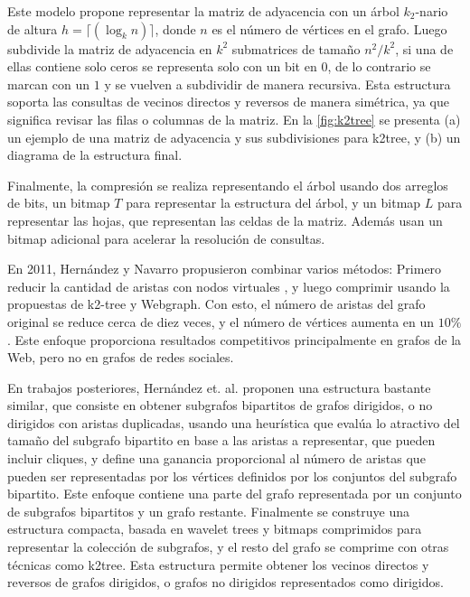 Este modelo propone representar la matriz de adyacencia con un árbol $k_{2}$-nario de altura $h=\lceil(\log_k n)\rceil$, donde $n$ es el número de vértices en el grafo. Luego subdivide la matriz de adyacencia en $k^2$ submatrices de tamaño $n^{2}/k^{2}$, si una de ellas contiene solo ceros se representa solo con un bit en $0$, de lo contrario se marcan con un $1$ y se vuelven a subdividir de manera recursiva. Esta estructura soporta las consultas de vecinos directos y reversos de manera simétrica, ya que significa revisar las filas o columnas de la matriz. En la \autoref{fig:k2tree} se presenta (a) un ejemplo de una matriz de adyacencia y sus subdivisiones para k2tree, y (b) un diagrama de la estructura final.



Finalmente, la compresión se realiza representando el árbol usando dos arreglos de bits, un bitmap $T$ para representar la estructura del árbol, y un bitmap $L$ para representar las hojas, que representan las celdas de la matriz. Además usan un bitmap adicional para acelerar la resolución de consultas. 

En 2011, Hernández y Navarro \cite{hernandez2011compression} propusieron combinar varios métodos: Primero reducir la cantidad de aristas con nodos virtuales \cite{BuehrerChellapilla},  y luego comprimir usando la propuestas de k2-tree y Webgraph. Con esto, el número de aristas del grafo original se reduce cerca de diez veces, y el número de vértices aumenta en un $10\%$. Este enfoque proporciona resultados competitivos principalmente en grafos de la Web, pero no en grafos de redes sociales.

En trabajos posteriores, Hernández et. al. \cite{hernandez2009managing, hernandez2012compressed, hernandez2014compressed} proponen una estructura bastante similar, que consiste en obtener subgrafos bipartitos de grafos dirigidos, o no dirigidos con aristas duplicadas, usando una heurística que evalúa lo atractivo del tamaño del subgrafo bipartito en base a las aristas a representar, que pueden incluir cliques, y define una ganancia proporcional al número de aristas que pueden ser representadas por los vértices definidos por los conjuntos del subgrafo bipartito. Este enfoque contiene una parte del grafo representada por un conjunto de subgrafos bipartitos y un grafo restante. Finalmente se construye una estructura compacta, basada en wavelet trees y bitmaps comprimidos para representar la colección de subgrafos, y el resto del grafo se comprime con otras técnicas como k2tree. Esta estructura permite obtener los vecinos directos y reversos de grafos dirigidos, o grafos no dirigidos representados como dirigidos.


